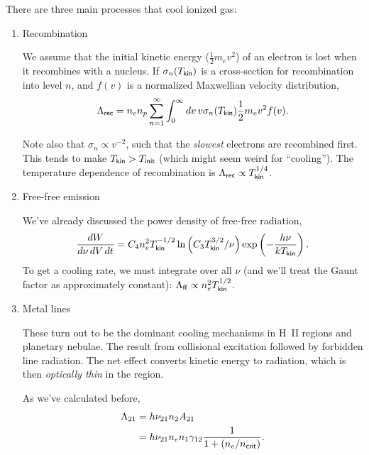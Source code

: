 \documentclass{tufte-handout}
\renewcommand{\rm}{\sf}
\newcommand{\HII}{\textnormal{H{\smaller~\textsc{II}}}}
\begin{document}
There are three main processes that cool ionized gas:
\begin{enumerate}
\item Recombination

We assume that the initial kinetic energy ($\frac{1}{2}m_e v^2$) of an electron is lost when it recombines with a nucleus. If $\sigma_n(T_{\rm kin})$ is a cross-section for recombination into level $n$, and $f(v)$ is a normalized Maxwellian velocity distribution,
\begin{equation}
\Lambda_{\rm rec} = n_e n_p \sum_{n=1}^\infty \int_0^\infty dv \, v \sigma_n(T_{\rm kin}) \frac{1}{2}m_e v^2 f(v).
\end{equation}

Note also that $\sigma_n \propto v^{-2}$, such that the \textit{slowest} electrons are recombined first. This tends to make $T_{\rm kin} > T_{\rm init}$ (which might seem weird for ``cooling''). The temperature dependence of recombination is $\Lambda_{\rm rec} \propto T_{\rm kin}^{1/4}$.

\item Free-free emission

We've already discussed the power density of free-free radiation,
\[\frac{dW}{d\nu\, dV\, dt} = C_4 n_e^2 T_{\rm kin}^{-1/2} \ln\left (C_3 T_{\rm kin}^{3/2	}/\nu\right ) \exp\left (-\frac{h\nu}{kT_{\rm kin}}\right ).\]
To get a cooling rate, we must integrate over all $\nu$ (and we'll treat the Gaunt factor as approximately constant): $\Lambda_{\rm ff} \propto n_e^2 T_{\rm kin}^{1/2}$.

\item Metal lines

These turn out to be the dominant cooling mechanisms in \HII{} regions and planetary nebulae.
The result from collisional excitation followed by forbidden line radiation. The net effect converts kinetic energy to radiation, which is then \textit{optically thin} in the region.

As we've calculated before,
\begin{align}
\Lambda_{21} &= h\nu_{21} n_2 A_{21} \nonumber \\
&= h\nu_{21} n_e n_1 \gamma_{12} \frac{1}{1+ \left (n_{e}/ n_{\rm crit}\right )}.
\end{align}
\end{enumerate}
\end{document}
